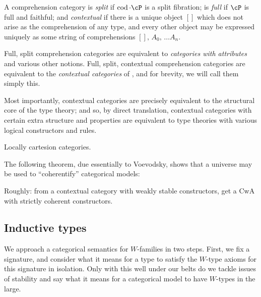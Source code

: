 \documentclass{amsart}
\begin{document}
\begin{defn}
A comprehension category is \emph{split} if $\cod \cdot \cP$ is a split fibration; is \emph{full} if $\cP$ is full and faithful; and \emph{contextual} if there is a unique object $[]$ which does not arise as the comprehension of any type, and every other object may be expressed uniquely as some string of comprehensions $[],\, A_0,\, \ldots A_n$. 
\end{defn}

Full, split comprehension categories are equivalent to \emph{categories with attributes} \cite{cwa-reference?} and various other notions.
Full, split, contextual comprehension categories are equivalent to the \emph{contextual categories} of \cite{streicher:book}, and for brevity, we will call them simply this.

Most importantly, contextual categories are precisely equivalent to the structural core of the type theory; and so, by direct translation, contextual categories with certain extra structure and properties are equivalent to type theories with various logical constructors and rules.


\begin{eg}
Locally cartesion categories.
\end{eg}


The following theorem, due essentially to Voevodsky, shows that a universe may be used to “coherentify” categorical models:
 
\begin{thm} \label{thm:coherence-from-universes}
Roughly: from a contextual category with weakly stable constructors, get a CwA with strictly coherent constructors.
\end{thm}

\subsection{Inductive types}


We approach a categorical semantics for $W$-families in two steps.
First, we fix a signature, and consider what it means for a type to satisfy the $W$-type axioms for this signature in isolation.
Only with this well under our belts do we tackle issues of stability and say what it means for a categorical model to have $W$-types in the large.
\end{document}
